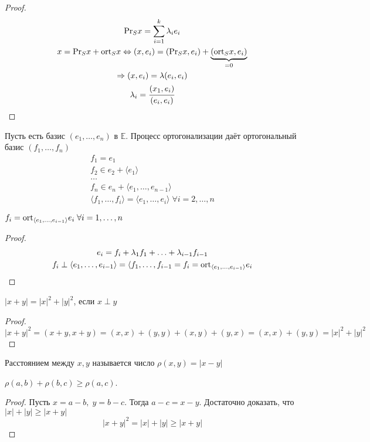 \begin{proof}
	\begin{gather*}
		\mathrm{Pr}_S x = \sum\limits_{i = 1}^{k}\lambda_ie_i\\
		x = \mathrm{Pr}_S x + \mathrm{ort}_S x\Leftrightarrow (x, e_i) = (\mathrm{Pr}_S x, e_i) + \underbrace{(\mathrm{ort}_S x, e_i)}_{=0}\\
		\Rightarrow (x, e_i) = \lambda (e_i, e_i)\\
		\lambda_i = \cfrac{(x_1, e_i)}{(e_i, e_i)}
	\end{gather*}
\end{proof}
Пусть есть базис $(e_1, \ldots, e_n)$ в $\mathbb{E}$. Процесс ортогонализации даёт ортогональный базис $(f_1, \ldots, f_n)$
\begin{gather*}
	f_1 = e_1\\
	f_2 \in e_2 + \langle e_1 \rangle\\
	\ldots\\
	f_n  \in e_n + \langle e_1, \ldots, e_{n - 1} \rangle\\
	\langle f_1, \ldots, f_i \rangle = \langle e_1, \ldots, e_i\rangle\; \forall i= 2, \ldots, n
\end{gather*}
\begin{Suggestion}
	$f_i = \mathrm{ort}_{\langle e_1, \ldots, e_{i-1}\rangle} e_i\; \forall i = 1, \ldots, n$
\end{Suggestion}
\begin{proof}
	\begin{gather*}
		e_i = f_i + \lambda_1f_1 + \ldots + \lambda_{i -1} f_{i -1}\\
		f_i \perp \langle e_1, \ldots, e_{i -1} \rangle = \langle f_1, \ldots, f_{i - 1} = f_i = \mathrm{ort}_{\langle e_1, \ldots, e_{i-1}\rangle} e_i
	\end{gather*}
\end{proof}
\begin{Theorem}[Пифагор]
	$|x+y| = |x|^2 + |y|^2$, если $x \perp y$
\end{Theorem}
\begin{proof}
	$|x + y|^2 = (x+y, x+y) = (x,x) + (y,y) + (x,y) + (y,x) = (x,x) + (y,y) = |x|^2 + |y|^2$
\end{proof}
\begin{Def}
	Расстоянием между $x,y$ называется число $\rho(x,y) = |x-y|$
\end{Def}
\begin{Suggestion}
	$\rho(a,b) + \rho(b,c) \geqslant \rho(a,c)$.
\end{Suggestion}
\begin{proof}
	Пусть $x = a-b,\; y = b - c$. Тогда $a-c = x -y$. Достаточно доказать, что $|x| + |y| \geqslant |x + y|$
	\[
		|x+y|^2 = |x| + |y| \geqslant |x+y|
	\]
\end{proof}
